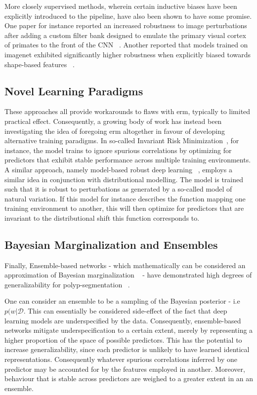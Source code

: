 More closely supervised methods, wherein certain inductive biases have been explicitly introduced to the pipeline, have also been shown to have some promise. One paper for instance reported an increased robustness to image perturbations after adding a custom filter bank designed to emulate the primary visual cortex of primates to the front of the CNN ~\cite{visual_cortex}. Another reported that models trained on imagenet exhibited significantly higher robustness when explicitly biased towards shape-based features ~\cite{texturebias}. 

\subsection{Novel Learning Paradigms}
These approaches all provide workarounds to flaws with \gls{erm}, typically to limited practical effect. Consequently, a growing body of work has instead been investigating the idea of foregoing \gls{erm} altogether in favour of developing alternative training paradigms. In so-called Invariant Risk Minimization~\cite{IRM}, for instance, the model trains to ignore spurious correlations by optimizing for predictors that exhibit stable performance across multiple training environments. A similar approach, namely model-based robust deep learning ~\cite{modelbased}, employs a similar idea in conjunction with distributional modelling. The model is trained such that it is robust to perturbations as generated by a so-called model of natural variation. If this model for instance describes the function mapping one training environment to another, this will then optimize for predictors that are invariant to the distributional shift this function corresponds to. 

\subsection{Bayesian Marginalization and Ensembles}
Finally, Ensemble-based networks - which mathematically can be considered an approximation of Bayesian marginalization ~\cite{bayesian_case,bayesian_generalization} - have demonstrated high degrees of generalizability for polyp-segmentation ~\cite{divergentnets,endoensemble}. 

One can consider an ensemble to be a sampling of the Bayesian posterior - i.e \(p(w | \mathcal{D}\). This can essentially be considered side-effect of the fact that deep learning models are underspecified by the data. Consequently, ensemble-based networks mitigate underspecification to a certain extent, merely by representing a higher proportion of the space of possible predictors. This has the potential to increase generalizability, since each predictor is unlikely to have learned identical representations. Consequently whatever spurious correlations inferred by one predictor may be accounted for by the features employed in another. Moreover, behaviour that is stable across predictors are weighed to a greater extent in an an ensemble. 

